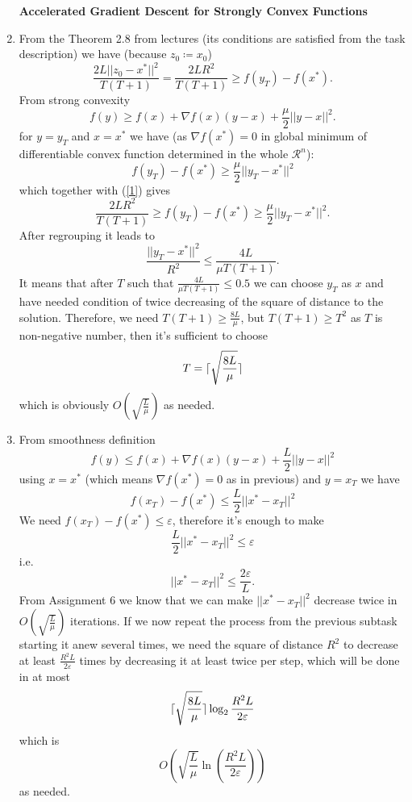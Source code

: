 \documentclass[]{article}
\DeclarePairedDelimiter\ceil{\lceil}{\rceil}
\begin{document}
\begin{enumerate}
	\textbf{Accelerated Gradient Descent for Strongly Convex Functions}
	\item From the Theorem 2.8 from lectures (its conditions are satisfied from the task description) we have (because $z_0 \coloneqq x_0$)
	\begin{equation}
	\label{1}
	\frac{2L||z_0-x^*||^2}{T(T+1)}=\frac{2LR^2}{T(T+1)}\ge f(y_T)-f(x^*).
	\end{equation}
	From strong convexity 
	$$
	f(y) \ge f(x) + \nabla f(x) (y-x) + \frac{\mu}{2}||y-x||^2.$$ for $y=y_T$ and $x=x^*$ we have (as $\nabla f(x^*)=0$ in global minimum of differentiable convex function determined in the whole $\mathcal{R}^n$):
	\begin{equation}
	\label{2}
	f(y_T)-f(x^*)\ge \frac{\mu}{2}||y_T-x^*||^2
	\end{equation}
	which together with (\ref{1}) gives
	\begin{equation}
	\label{3}
	\frac{2LR^2}{T(T+1)}\ge f(y_T)-f(x^*)\ge\frac{\mu}{2}||y_T-x^*||^2.
	\end{equation}
	After regrouping it leads to
	\begin{equation}
	\label{3}
	\frac{||y_T-x^*||^2}{R^2}\le
	\frac{4L}{\mu T(T+1)}.
	\end{equation}
	It means that after $T$ such that $\frac{4L}{\mu T(T+1)}\le0.5$ we can choose $y_T$ as $x$ and have needed condition of twice decreasing of the square of distance to the solution. Therefore, we need $T(T+1)\ge \frac{8L}{\mu}$, but $T(T+1) \ge T^2$ as $T$ is non-negative number, then it's sufficient to choose $$T=\ceil{\sqrt{\frac{8L}{\mu}}}$$
	which is obviously $O(\sqrt{\frac{L}{\mu}})$ as needed.
	\item From smoothness definition
	$$f(y) \le f(x) + \nabla f(x) (y-x) + \frac{L}{2}||y-x||^2$$
	using $x=x^*$ (which means $\nabla f(x^*)=0$ as in previous) and $y=x_T$ we have
	$$f(x_T)-f(x^*)\le\frac{L}{2}||x^*-x_T||^2$$
	We need $f(x_T)-f(x^*)\le\varepsilon$, therefore it's enough to make $$\frac{L}{2}||x^*-x_T||^2\le\varepsilon$$ i.e. $$||x^*-x_T||^2\le\frac{2\varepsilon}{L}.$$
	From Assignment 6 we know that we can make $||x^*-x_T||^2$ decrease twice in $O(\sqrt{\frac{L}{\mu}})$ iterations. If we now repeat the process from the previous subtask starting it anew several times, we need the square of distance $R^2$ to decrease at least $\frac{R^2L}{2\varepsilon}$ times by decreasing it at least twice per step, which will be done in at most $$\ceil{\sqrt{\frac{8L}{\mu}}}\log_2 \frac{R^2L}{2\varepsilon} $$ which is $$O(\sqrt{\frac{L}{\mu}}\ln(\frac{R^2L}{2\varepsilon}))$$
	as needed.
\end{enumerate}
\end{document}
